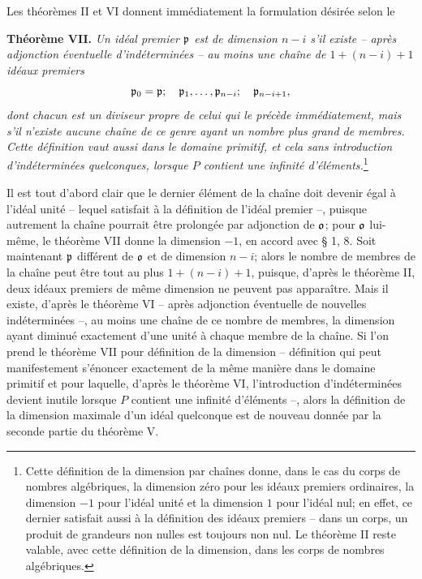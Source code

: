 Les théorèmes II et VI donnent immédiatement la formulation désirée selon le

\textbf{Théorème VII.} \emph{Un idéal premier $\mathfrak p$ est de dimension $n-i$ s'il existe -- après adjonction éventuelle d'indéterminées -- au moins une chaîne de $1+(n-i)+1$ idéaux premiers}
\[
 \mathfrak p_0=\mathfrak p;\quad \mathfrak p_1,\ldots,\mathfrak p_{n-i};\quad \mathfrak p_{n-i+1},
\]
\emph{dont chacun est un diviseur propre de celui qui le précède immédiatement, mais s'il n'existe aucune chaîne de ce genre ayant un nombre plus grand de membres. Cette définition vaut aussi dans le domaine primitif, et cela sans introduction d'indéterminées quelconques, lorsque $P$ contient une infinité d'éléments.}\footnote{Cette définition de la dimension par chaînes donne, dans le cas du corps de nombres algébriques, la dimension zéro pour les idéaux premiers ordinaires, la dimension $-1$ pour l'idéal unité et la dimension $1$ pour l'idéal nul; en effet, ce dernier satisfait aussi à la définition des idéaux premiers -- dans un corps, un produit de grandeurs non nulles est toujours non nul. Le théorème II reste valable, avec cette définition de la dimension, dans les corps de nombres algébriques.}

Il est tout d'abord clair que le dernier élément de la chaîne doit devenir égal à l'idéal unité -- lequel satisfait à la définition de l'idéal premier --, puisque autrement la chaîne pourrait être prolongée par adjonction de $\mathfrak o$; pour $\mathfrak o$ lui-même, le théorème VII donne la dimension $-1$, en accord avec \S{} 1, 8. Soit maintenant $\mathfrak p$ différent de $\mathfrak o$ et de dimension $n-i$; alors le nombre de membres de la chaîne peut être tout au plus $1+(n-i)+1$, puisque, d'après le théorème II, deux idéaux premiers de même dimension ne peuvent pas apparaître. Mais il existe, d'après le théorème VI -- après adjonction éventuelle de nouvelles indéterminées --, au moins une chaîne de ce nombre de membres, la dimension ayant diminué exactement d'une unité à chaque membre de la chaîne. Si l'on prend le théorème VII pour définition de la dimension -- définition qui peut manifestement s'énoncer exactement de la même manière dans le domaine primitif et pour laquelle, d'après le théorème VI, l'introduction d'indéterminées devient inutile lorsque $P$ contient une infinité d'éléments --, alors la définition de la dimension maximale d'un idéal quelconque est de nouveau donnée par la seconde partie du théorème V.
